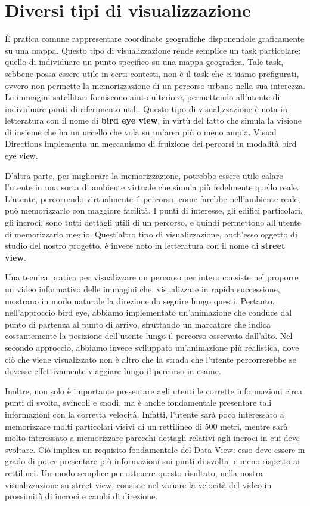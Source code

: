 \documentclass[12pt,a4paper,openright, notitlepage]{report}
\begin{document}
\section{Diversi tipi di visualizzazione}

È pratica comune rappresentare coordinate geografiche disponendole graficamente su una mappa. Questo tipo di visualizzazione rende semplice un task particolare: quello di individuare un punto specifico su una mappa geografica. Tale task, sebbene possa essere utile in certi contesti, non è il task che ci siamo prefigurati, ovvero non permette la memorizzazione di un percorso urbano nella sua interezza. Le immagini satellitari forniscono aiuto ulteriore, permettendo all'utente di individuare punti di riferimento utili. Questo tipo di visualizzazione è nota in letteratura con il nome di \textbf{bird eye view}, in virtù del fatto che simula la visione di insieme che ha un uccello che vola su un’area più o meno ampia. Visual Directions implementa un meccanismo di fruizione dei percorsi in modalità bird eye view.

D'altra parte, per migliorare la memorizzazione, potrebbe essere utile calare l'utente in una sorta di ambiente virtuale che simula più fedelmente quello reale. L'utente, percorrendo virtualmente il percorso, come farebbe nell'ambiente reale, può memorizzarlo con maggiore facilità. I punti di interesse, gli edifici particolari, gli incroci, sono tutti dettagli utili di un percorso, e quindi permettono all’utente di memorizzarlo meglio. Quest’altro tipo di visualizzazione, anch’esso oggetto di studio del nostro progetto, è invece noto in letteratura con il nome di \textbf{street view}.

Una tecnica pratica per visualizzare un percorso per intero consiste nel proporre un video informativo delle immagini che, visualizzate in rapida successione, mostrano in modo naturale la direzione da seguire lungo questi. Pertanto, nell’approccio bird eye, abbiamo implementato un’animazione che conduce dal punto di partenza al punto di arrivo, sfruttando un marcatore che indica costantemente la posizione dell’utente lungo il percorso osservato dall’alto. Nel secondo approccio, abbiamo invece sviluppato un’animazione più realistica, dove ciò che viene visualizzato non è altro che la strada che l’utente percorrerebbe se dovesse effettivamente viaggiare lungo il percorso in esame.

Inoltre, non solo è importante presentare agli utenti le corrette informazioni circa punti di svolta, svincoli e snodi, ma è anche fondamentale presentare tali informazioni con la corretta velocità. Infatti, l’utente sarà poco interessato a memorizzare molti particolari visivi di un rettilineo di 500 metri, mentre sarà molto interessato a memorizzare parecchi dettagli relativi agli incroci in cui deve svoltare. Ciò implica un requisito fondamentale del Data View: esso deve essere in grado di poter presentare più informazioni sui punti di svolta, e meno rispetto ai rettilinei. Un modo semplice per ottenere questo risultato, nella nostra visualizzazione su street view, consiste nel variare la velocità del video in prossimità di incroci e cambi di direzione.
\end{document}
